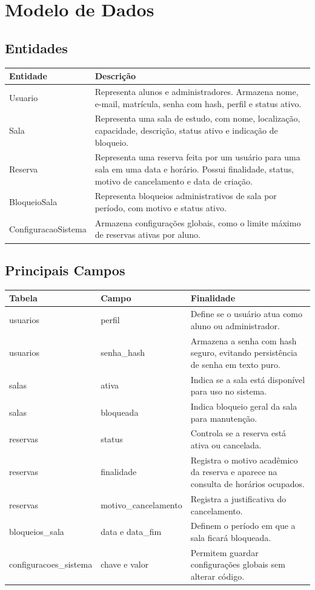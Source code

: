 \documentclass[12pt,a4paper]{article}
\begin{document}
\section{Modelo de Dados}

\subsection{Entidades}
\begin{longtable}{|p{4cm}|p{10.5cm}|}
\hline
\textbf{Entidade} & \textbf{Descrição} \\ \hline
Usuario & Representa alunos e administradores. Armazena nome, e-mail, matrícula, senha com hash, perfil e status ativo. \\ \hline
Sala & Representa uma sala de estudo, com nome, localização, capacidade, descrição, status ativo e indicação de bloqueio. \\ \hline
Reserva & Representa uma reserva feita por um usuário para uma sala em uma data e horário. Possui finalidade, status, motivo de cancelamento e data de criação. \\ \hline
BloqueioSala & Representa bloqueios administrativos de sala por período, com motivo e status ativo. \\ \hline
ConfiguracaoSistema & Armazena configurações globais, como o limite máximo de reservas ativas por aluno. \\ \hline
\end{longtable}

\subsection{Principais Campos}
\begin{longtable}{|p{4cm}|p{5cm}|p{5.5cm}|}
\hline
\textbf{Tabela} & \textbf{Campo} & \textbf{Finalidade} \\ \hline
usuarios & perfil & Define se o usuário atua como aluno ou administrador. \\ \hline
usuarios & senha\_hash & Armazena a senha com hash seguro, evitando persistência de senha em texto puro. \\ \hline
salas & ativa & Indica se a sala está disponível para uso no sistema. \\ \hline
salas & bloqueada & Indica bloqueio geral da sala para manutenção. \\ \hline
reservas & status & Controla se a reserva está ativa ou cancelada. \\ \hline
reservas & finalidade & Registra o motivo acadêmico da reserva e aparece na consulta de horários ocupados. \\ \hline
reservas & motivo\_cancelamento & Registra a justificativa do cancelamento. \\ \hline
bloqueios\_sala & data e data\_fim & Definem o período em que a sala ficará bloqueada. \\ \hline
configuracoes\_sistema & chave e valor & Permitem guardar configurações globais sem alterar código. \\ \hline
\end{longtable}
\end{document}
